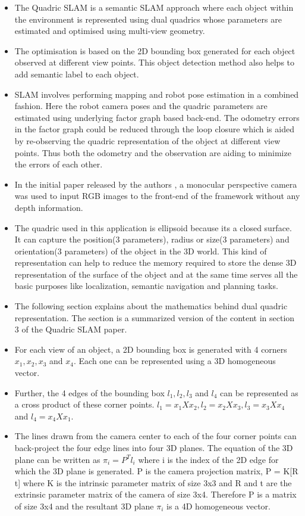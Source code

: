 \documentclass{article}
\begin{document}
\begin{itemize}
\item The Quadric SLAM is a semantic SLAM approach where each object within the environment is represented using dual quadrics whose parameters are estimated and optimised using multi-view geometry.
\item The optimisation is based on the 2D bounding box generated for each object observed at different view points. This object detection method also helps to add semantic label to each object.
\item SLAM involves performing mapping and robot pose estimation in a combined fashion. Here the robot camera poses and the quadric parameters are estimated using underlying factor graph based back-end. The odometry errors in the factor graph could be reduced through the loop closure which is aided by re-observing the quadric representation of the object at different view points. Thus both the odometry and the observation are aiding to minimize the errors of each other.
\item In the initial paper released by the authors \cite{sünderhauf2017dual}, a monocular perspective camera was used to input RGB images to the front-end of the framework without any depth information.
\item The quadric used in this application is ellipsoid because its a closed surface. It can capture the position(3 parameters), radius or size(3 parameters) and orientation(3 parameters) of the object in the 3D world. This kind of representation can help to reduce the memory required to store the dense 3D representation of the surface of the object and at the same time serves all the basic purposes like localization, semantic navigation and planning tasks.
\item The following section explains about the mathematics behind dual quadric representation. The section is a summarized version of the content in section 3 of the Quadric SLAM paper\cite{sünderhauf2017dual}.
\item For each view of an object, a 2D bounding box is generated with 4 corners $x_{1}, x_{2}, x_{3}$ and $x_{4}$. Each one can be represented using a 3D homogeneous vector.
\item Further, the 4 edges of the bounding box $l_{1}, l_{2}, l_{3}$ and $l_{4}$ can be represented as a cross product of these corner points. $l_{1} = x_{1} X x_{2}, l_{2} = x_{2} X x_{3}, l_{3} = x_{3} X x_{4}$ and $l_{4} = x_{4} X x_{1}$.
\item The lines drawn from the camera center to each of the four corner points can back-project the four edge lines into four 3D planes. The equation of the 3D plane can be written as $\pi_{i} = P^{T}l_{i}$ where i is the index of the 2D edge for which the 3D plane is generated. P is the camera projection matrix, P = K[R t] where K is the intrinsic parameter matrix of size 3x3 and R and t are the extrinsic parameter matrix of the camera of size 3x4. Therefore P is a matrix of size 3x4 and the resultant 3D plane $\pi_{i}$ is a 4D homogeneous vector.

\end{itemize}
\end{document}
